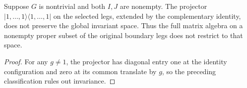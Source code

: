 \begin{corollary}%
    \label{cor:peps_regular_boundary_local_matrix_unit}
    \leanok
    Suppose $G$ is nontrivial and both $I,J$ are nonempty.
    The projector $|1,\ldots,1\rangle\langle1,\ldots,1|$
    on the selected legs, extended by the complementary identity,
    does not preserve the global invariant space.
    Thus the full matrix algebra on a nonempty proper subset
    of the original boundary legs does not restrict to that space.
\end{corollary}

\begin{proof}\leanok
    For any $g\ne1$, the projector has diagonal entry one at the
    identity configuration and zero at its common translate by $g$, so the
    preceding classification rules out invariance.
\end{proof}
